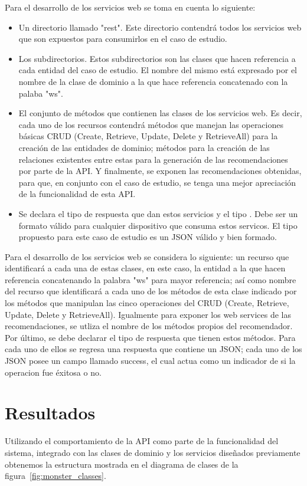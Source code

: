   Para el desarrollo de los servicios web se toma en cuenta lo siguiente:
  \begin{itemize}
    \item Un directorio llamado "rest". Este directorio contendrá todos los servicios web que son expuestos para consumirlos en el caso de estudio.
    \item Los subdirectorios. Estos subdirectorios son las clases que hacen referencia a cada entidad del caso de estudio. El nombre del mismo está expresado por el nombre de la clase de dominio a la que hace referencia concatenado con la palaba "ws".
    \item El conjunto de métodos que contienen las clases de los servicios web. Es decir, cada uno de los recursos contendrá métodos que manejan las operaciones básicas CRUD (Create, Retrieve, Update, Delete y RetrieveAll) para la creación de las entidades de dominio; métodos para la creación de las relaciones existentes entre estas para la generación de las recomendaciones por parte de la API. Y finalmente, se exponen las recomendaciones obtenidas, para que, en conjunto con el caso de estudio, se tenga una mejor apreciación de la funcionalidad de esta API.
    \item Se declara el tipo de respuesta que dan estos servicios y el tipo . Debe ser un formato válido para cualquier dispositivo que consuma estos servicos. El tipo propuesto para este caso de estudio es un JSON válido y bien formado.
  \end{itemize}

  Para el desarrollo de los servicios web se considera lo siguiente: un recurso que identificará a cada una de estas clases, en este caso, la entidad a la que hacen referencia concatenando la palabra "ws" para mayor referencia; así como nombre del recurso que identificará a cada uno de los métodos de esta clase indicado por los métodos que manipulan las cinco operaciones del CRUD (Create, Retrieve, Update, Delete y RetrieveAll). Igualmente para exponer los web services de las recomendaciones, se utliza el nombre de los métodos propios del recomendador. Por último, se debe declarar el tipo de respuesta que tienen estos métodos. Para cada uno de ellos se regresa una respuesta que contiene un JSON; cada uno de los JSON posee un campo llamado success, el cual actua como un indicador de si la operacion fue éxitosa o no.

  \section{Resultados}
    Utilizando el comportamiento de la API como parte de la funcionalidad del sistema, integrado con las clases de dominio y los servicios diseñados previamente obtenemos la estructura mostrada en el diagrama de clases de la figura~\ref{fig:monster_classes}. 

